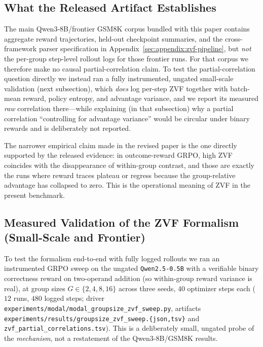 \subsection{What the Released Artifact Establishes}

The main Qwen3-8B/frontier GSM8K corpus bundled with this paper contains
aggregate reward trajectories, held-out checkpoint summaries, and the
cross-framework parser specification in Appendix~\ref{sec:appendix:zvf-pipeline},
but \emph{not} the per-group step-level rollout logs for those frontier runs.
For that corpus we therefore make no causal partial-correlation claim. To test
the partial-correlation question directly we instead ran a fully instrumented,
ungated small-scale validation (next subsection), which \emph{does} log
per-step ZVF together with batch-mean reward, policy entropy, and advantage
variance, and we report its measured \emph{raw} correlation there---while
explaining (in that subsection) why a partial correlation ``controlling for
advantage variance'' would be circular under binary rewards and is deliberately
not reported.

The narrower empirical claim made in the revised paper is the one directly
supported by the released evidence: in outcome-reward GRPO, high ZVF
coincides with the disappearance of within-group contrast, and those are
exactly the runs where reward traces plateau or regress because the
group-relative advantage has collapsed to zero. This is the operational
meaning of ZVF in the present benchmark.

\subsection{Measured Validation of the ZVF Formalism (Small-Scale and Frontier)}
\label{sec:appendix:zvf-measured}

To test the formalism end-to-end with fully logged rollouts we ran an
instrumented GRPO sweep on the ungated \texttt{Qwen2.5-0.5B} with a verifiable
binary correctness reward on two-operand addition (so within-group reward
variance is real), at group sizes $G \in \{2,4,8,16\}$ across three seeds, $40$
optimizer steps each ($12$ runs, $480$ logged steps; driver
\texttt{experiments/modal/modal\_groupsize\_zvf\_sweep.py}, artifacts
\texttt{experiments/results/groupsize\_zvf\_sweep.\{json,tsv\}} and
\texttt{zvf\_partial\_correlations.tsv}). This is a deliberately small,
ungated probe of the \emph{mechanism}, not a restatement of the
Qwen3-8B/GSM8K results.

